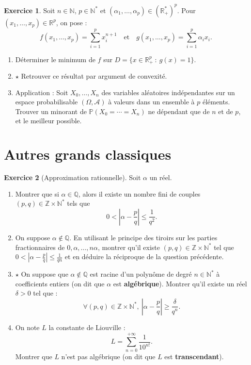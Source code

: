 \documentclass[french]{article}
\renewcommand{\P}{\mathbb{P}}
\newcommand{\N}{\mathbb{N}}
\newcommand{\Z}{\mathbb{Z}}
\newcommand{\Q}{\mathbb{Q}}
\newcommand{\R}{\mathbb{R}}
\newcommand{\st}{^*}
\theoremstyle{definition}
\newtheorem{exo}{Exercice}
\begin{document}
\begin{exo}
	Soit $n\in\N$, $p\in\N\st$ et $(\alpha_1,\ldots,\alpha_p)\in(\R_+\st)^p$. Pour $(x_1,\ldots,x_p)\in\R^p$, on pose :
	$$f(x_1,\ldots,x_p)=\sum_{i=1}^{p}x_i^{n+1}\quad\text{et}\quad g(x_1,\ldots,x_p)=\sum_{i=1}^{p}\alpha_ix_i.$$
	\begin{enumerate}
		\item Déterminer le minimum de $f$ sur $D=\{x\in \R_+^p\ :\ g(x)=1\}$.
		\item $\star$ Retrouver ce résultat par argument de convexité.
		\item Application : Soit $X_0,\ldots,X_n$ des variables aléatoires indépendantes sur un espace probabilisable $(\Omega,\mathcal{A})$ à valeurs dans un ensemble à $p$ éléments.\\
		Trouver un minorant de $\P(X_0=\cdots=X_n)$ ne dépendant que de $n$ et de $p$, et le meilleur possible.
	\end{enumerate}
\end{exo}

\section*{Autres grands classiques}

\begin{exo}[Approximation rationnelle]
	Soit $\alpha$ un réel.
	\begin{enumerate}
		\item Montrer que si $\alpha\in\Q$, alors il existe un nombre fini de couples $(p,q)\in\Z\times\N\st$ tels que $$0<\left\lvert\alpha-\frac{p}{q}\right\rvert\leqslant\frac{1}{q^2}.$$
		\item On suppose $\alpha\notin\Q$. En utilisant le principe des tiroirs sur les parties fractionnaires de $0,\alpha,\ldots,n\alpha$, montrer qu'il existe $(p,q)\in\Z\times\N\st$ tel que $0<\displaystyle\left\lvert\alpha-\frac{p}{q}\right\rvert\leqslant\frac{1}{qn}$ et en déduire la réciproque de la question précédente.
		\item $\star$ On suppose que $\alpha\notin\Q$ est racine d'un polynôme de degré $n\in\N\st$ à coefficients entiers (on dit que $\alpha$ est \textbf{algébrique}). Montrer qu'il existe un réel $\delta>0$ tel que :
		$$\forall (p,q)\in\Z\times\N\st,\ \left\lvert\alpha-\frac{p}{q}\right\rvert\geqslant\frac{\delta}{q^n}.$$
		\item On note $L$ la constante de Liouville :
		$$L=\sum_{n=0}^{+\infty}\frac{1}{10^{n!}}.$$
		Montrer que $L$ n'est pas algébrique (on dit que $L$ est \textbf{transcendant}).
	\end{enumerate}
\end{exo}
\end{document}
